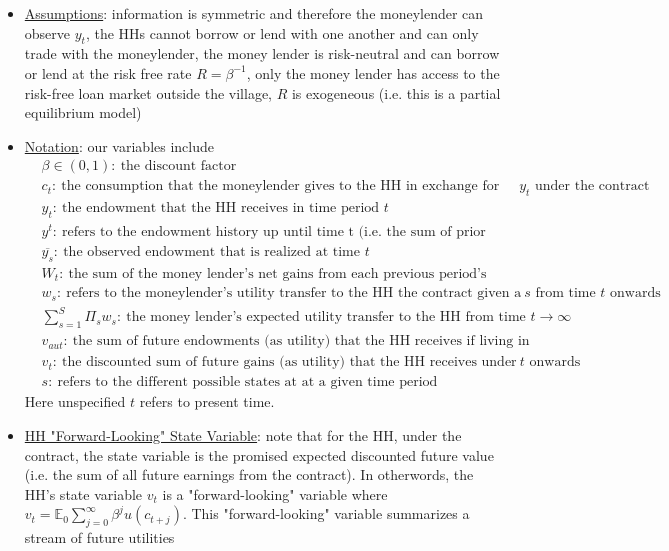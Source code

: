\documentclass{article}
\begin{document}
\begin{itemize}
    \item  \underline{Assumptions}: information is symmetric and therefore the moneylender can observe $y_{t}$, the HHs cannot borrow or lend with one another and can only trade with the moneylender, the money lender is risk-neutral and can borrow or lend at the risk free rate $R = \beta^{-1}$, only the money lender has access to the risk-free loan market outside the village, $R$ is exogeneous (i.e. this is a partial equilibrium model)
    \item  \underline{Notation}: our variables include
    \begin{align*}
    &\beta \in (0,1): \ \text{the discount factor} \\
    &c_{t}:\ \text{the consumption that the moneylender gives to the HH in exchange for the endowment $y_{t}$ under the contract} \\
    &y_{t}:\ \text{the endowment that the HH receives in time period $t$} \\
    &y^{t}:\ \text{refers to the endowment history up until time t (i.e. the sum of prior endowments)} \\
    &\overline{y_{s}}: \ \text{the observed endowment that is realized at time $t$} \\
    &W_{t}: \ \text{the sum of the money lender's net gains from each previous period's contract up until time t} \\
    &w_{s}: \ \text{refers to the moneylender's utility transfer to the HH the contract given a particular future state $s$ from time $t$ onwards} \\
    &\text{$\sum_{s=1}^{S}$} \Pi_{s} w_{s}: \ \text{the money lender's expected utility transfer to the HH from time $t \rightarrow \infty$} \\
    &v_{aut}: \ \text{the sum of future endowments (as utility) that the HH receives if living in autarky} \\
    &v_{t}: \ \text{the discounted sum of future gains (as utility) that the HH receives under the contract from time $t$ onwards} \\
    &s: \ \text{refers to the different possible states at at a given time period}
\end{align*}
    Here unspecified $t$ refers to present time.
    \item  \underline{HH "Forward-Looking" State Variable}: note that for the HH, under the contract, the state variable is the promised expected discounted future value (i.e. the sum of all future earnings from the contract). In otherwords, the HH's state variable $v_{t}$ is a "forward-looking" variable where  $v_{t} = \mathbb{E}_{0} \sum_{j=0}^{\infty} \beta^{j} u(c_{t+j})$. This "forward-looking" variable summarizes a stream of future utilities

\end{itemize}
\end{document}
